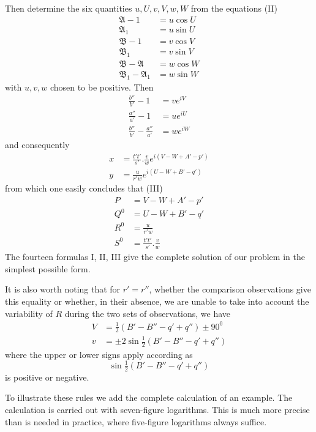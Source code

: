 Then determine the six quantities $u,U,v,V,w,W$ from the equations (II)
\[
\begin{aligned}
\mathfrak{A}-1&=u\cos U\\
\mathfrak{A}_1&=u\sin U\\
\mathfrak{B}-1&=v\cos V\\
\mathfrak{B}_1&=v\sin V\\
\mathfrak{B}-\mathfrak{A}&=w\cos W\\
\mathfrak{B}_1-\mathfrak{A}_1&=w\sin W
\end{aligned}
\]
with $u,v,w$ chosen to be positive. Then
\[
\begin{aligned}
\frac{b''}{b'}-1&=ve^{iV}\\
\frac{a''}{a'}-1&=ue^{iU}\\
\frac{b''}{b'}-\frac{a''}{a'}&=we^{iW}
\end{aligned}
\]
and consequently
\[
\begin{aligned}
x&=\frac{t't'}{s'}.\frac{v}{w}e^{i(V-W+A'-p')}\\
y&=\frac{u}{r'w}e^{i(U-W+B'-q')}
\end{aligned}
\]
from which one easily concludes that (III)
\[
\begin{aligned}
P&=V-W+A'-p'\\
Q^0&=U-W+B'-q'\\
R^0&=\frac{u}{r'w}\\
S^0&=\frac{t't'}{s'}.\frac{v}{w}
\end{aligned}
\]
The fourteen formulas I, II, III give the complete solution of our problem in the simplest possible form.

It is also worth noting that for $r'=r''$, whether the comparison observations give this equality or whether, in their absence, we are unable to take into account the variability of $R$ during the two sets of observations, we have
\[
\begin{aligned}
V&=\tfrac12(B'-B''-q'+q'')\pm90^0\\
v&=\pm2\sin\tfrac12(B'-B''-q'+q'')
\end{aligned}
\]
where the upper or lower signs apply according as
\[
\sin\tfrac12(B'-B''-q'+q'')
\]
is positive or negative.

To illustrate these rules we add the complete calculation of an example. The calculation is carried out with seven-figure logarithms. This is much more precise than is needed in practice, where five-figure logarithms always suffice.

